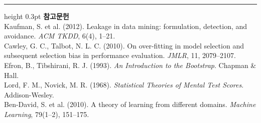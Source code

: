\documentclass[10pt]{article}
\begin{document}
\vspace{0.6em}
\hrule height 0.3pt
\vspace{0.5em}
{\footnotesize
\textbf{참고문헌}\\[0.3em]
Kaufman, S. et al. (2012). Leakage in data mining: formulation, detection, and
avoidance. \emph{ACM TKDD}, 6(4), 1--21.\\[0.15em]
Cawley, G. C., Talbot, N. L. C. (2010). On over-fitting in model selection and
subsequent selection bias in performance evaluation. \emph{JMLR}, 11, 2079--2107.\\[0.15em]
Efron, B., Tibshirani, R. J. (1993). \emph{An Introduction to the Bootstrap}.
Chapman \& Hall.\\[0.15em]
Lord, F. M., Novick, M. R. (1968). \emph{Statistical Theories of Mental Test
Scores}. Addison-Wesley.\\[0.15em]
Ben-David, S. et al. (2010). A theory of learning from different domains.
\emph{Machine Learning}, 79(1--2), 151--175.
}
\end{document}
